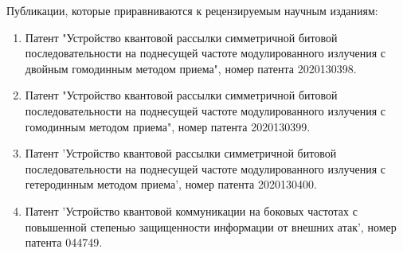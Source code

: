 Публикации, которые приравниваются к рецензируемым научным изданиям:
\begin{enumerate}
    \item Патент "Устройство квантовой рассылки симметричной битовой последовательности на поднесущей частоте модулированного излучения с двойным гомодинным методом приема", номер патента 2020130398.
    \item Патент "Устройство квантовой рассылки симметричной битовой последовательности на поднесущей частоте модулированного излучения с гомодинным методом приема", номер патента 2020130399.
    \item Патент 'Устройство квантовой рассылки симметричной битовой последовательности на поднесущей частоте модулированного излучения с гетеродинным методом приема', номер патента 2020130400.
    \item Патент 'Устройство квантовой коммуникации на боковых частотах с повышенной степенью защищенности информации от внешних атак', номер патента 044749.

\end{enumerate}
